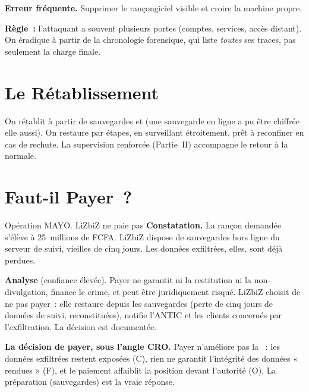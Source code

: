 \begin{boxalert}
\textbf{Erreur fréquente.} Supprimer le rançongiciel visible et croire la
machine propre.

\smallskip
\textbf{Règle~:} l'attaquant a souvent plusieurs portes (comptes, services,
accès distant). On éradique à partir de la chronologie forensique, qui liste
\emph{toutes} ses traces, pas seulement la charge finale.
\end{boxalert}

\section{Le Rétablissement}
\label{sec:c18-retablir}

On rétablit à partir de sauvegardes  et  (une sauvegarde en ligne a pu être chiffrée elle aussi). On restaure
par étapes, en surveillant étroitement, prêt à reconfiner en cas de rechute.
La supervision renforcée (Partie~II) accompagne le retour à la normale.

\section{Faut-il Payer~?}
\label{sec:c18-payer}

\begin{boxscenario}{Opération MAYO. LiZbiZ ne paie pas}
\textbf{Constatation.} La rançon demandée s'élève à 25~millions de FCFA.
LiZbiZ dispose de sauvegardes hors ligne du serveur de suivi, vieilles de
cinq jours. Les données exfiltrées, elles, sont déjà perdues.

\medskip
\textbf{Analyse} (confiance élevée). Payer ne garantit ni la restitution ni
la non-divulgation, finance le crime, et peut être juridiquement risqué.
LiZbiZ choisit de ne pas payer~: elle restaure depuis les sauvegardes
(perte de cinq jours de données de suivi, reconstituées), notifie l'ANTIC et
les clients concernés par l'exfiltration. La décision est documentée.
\end{boxscenario}

\begin{boxCRO}
\textbf{La décision de payer, sous l'angle CRO.} Payer n'améliore pas la
\cro{-}{-}{-}~: les données exfiltrées restent exposées (C), rien ne garantit
l'intégrité des données « rendues » (F), et le paiement affaiblit la position
devant l'autorité (O). La préparation (sauvegardes) est la vraie réponse.
\end{boxCRO}

